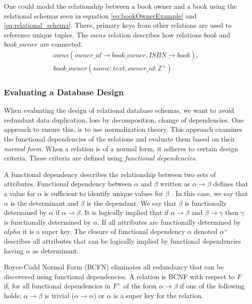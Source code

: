 One could model the relationship between a book owner and a book using the relational schemas seen in equation \ref{eq:bookOwnerExample} and \ref{eq:relational_schema}.
There, primary keys from other relations are used to reference unique tuples. The $owns$ relation describes how relations $book$ and $book\_owner$ are connected. 
\begin{equation}\label{eq:bookOwnerExample}
    \begin{split}
        owns(\underline{owner\_id \rightarrow book\_owner}, \underline{ISBN \rightarrow book}), \\
        book\_owner(name:text,\underline{owner\_id:\mathbb{Z}^+})
    \end{split}
\end{equation}

\subsubsection*{Evaluating a Database Design}
When evaluating the design of relational database schemas, we want to avoid redundant data duplication, loss by decomposition, change of dependencies\cite{DBSBook}.
One approach to ensure this, is to use normalization theory\cite{DBSBook}. This approach examines the functional dependencies of the relations and evaluate them based on their \textit{normal form}.
When a relation is of a normal form, it adheres to certain design criteria. These criteria are defined using \textit{functional dependencies}.

A functional dependency describes the relationship between two sets of attributes. 
Functional dependency between $\alpha$ and $\beta$ written as $\alpha \rightarrow \beta$ defines that a value for $\alpha$ is sufficient to identify unique values for $\beta$ \cite{DBSBook}.
In this case, we say that $\alpha$ is the determinant and $\beta$ is the dependant. 
We say that $\beta$ is functionally determined by $\alpha$ if $\alpha \rightarrow \beta$.
It is logically implied that if $\alpha \rightarrow \beta$ and $\beta \rightarrow \gamma$ then $\gamma$ is functionally determined by $\alpha$.
If all attributes are functionally determined by $alpha$ it is a super key\cite{DBSBook}.
The closure of functional dependency $\alpha$ denoted $\alpha^+$ describes all attributes that can be logically implied by functional dependencies having $\alpha$ as determinant\cite{DBSBook}. 

Boyce-Codd Normal Form (BCFN) eliminates all redundancy that can be discovered using functional dependencies\cite{DBSBook}. 
A relation is BCNF with respect to $F$ if, for all functional dependencies in $F^+$ of the form $\alpha \rightarrow \beta$ if one of the following holds:
$\alpha \rightarrow \beta$ is trivial ($\alpha \rightarrow \alpha$) or $\alpha$ is a super key for the relation.

